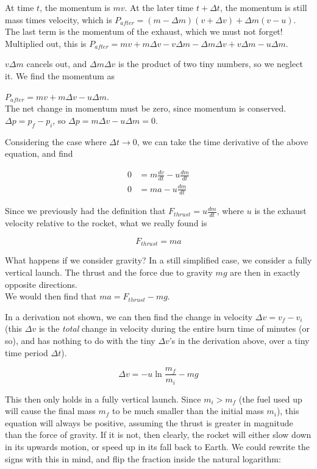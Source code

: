 \documentclass[12pt,a4paper]{report}
\begin{document}
At time $t$, the momentum is $m v$. At the later time $t + \Delta t$, the momentum is still mass times velocity, which is $P_{after} = (m - \Delta m)(v + \Delta v) + \Delta m(v - u)$. The last term is the momentum of the exhaust, which we must not forget!\\
Multiplied out, this is $P_{after} = m v + m \Delta v - v \Delta m - \Delta m \Delta v + v \Delta m - u \Delta m$. 

$v \Delta m$ cancels out, and $\Delta m \Delta v$ is the product of two tiny numbers, so we neglect it. We find the momentum as

$P_{after} = m v + m \Delta v - u \Delta m$.\\
The net change in momentum must be zero, since momentum is conserved. $\Delta p = p_f - p_i$, so $\Delta p = m \Delta v - u \Delta m = 0$.

Considering the case where $\Delta t \to 0$, we can take the time derivative of the above equation, and find

\begin{align}
0 &= m \frac{dv}{dt} - u \frac{dm}{dt}\\
0 &= m a - u \frac{dm}{dt}
\end{align}

Since we previously had the definition that $\displaystyle F_{thrust} = u \frac{dm}{dt}$, where $u$ is the exhaust velocity relative to the rocket, what we really found is

\begin{equation}
F_{thrust} = m a
\end{equation}

What happens if we consider gravity? In a still simplified case, we consider a fully vertical launch. The thrust and the force due to gravity $m g$ are then in exactly opposite directions.\\
We would then find that $m a = F_{thrust} - m g$.

In a derivation not shown, we can then find the change in velocity $\Delta v = v_f - v_i$ (this $\Delta v$ is the \emph{total} change in velocity during the entire burn time of minutes (or so), and has nothing to do with the tiny $\Delta v$'s in the derivation above, over a tiny time period $\Delta t$).

\begin{equation}
\Delta v = -u \ln \frac{m_f}{m_i} - m g
\end{equation}

This then only holds in a fully vertical launch. Since $m_i > m_f$ (the fuel used up will cause the final mass $m_f$ to be much smaller than the initial mass $m_i$), this equation will always be positive, assuming the thrust is greater in magnitude than the force of gravity. If it is not, then clearly, the rocket will either slow down in its upwards motion, or speed up in its fall back to Earth. We could rewrite the signs with this in mind, and flip the fraction inside the natural logarithm:
\end{document}
